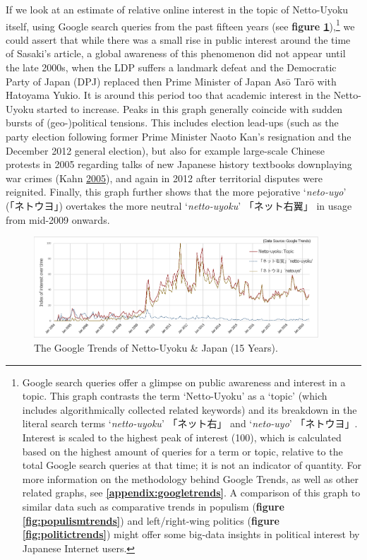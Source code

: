 \documentclass[10pt,british,A4paper,,openany]{memoir}
\begin{document}
If we look at an estimate of relative online interest in the topic of
Netto-Uyoku itself, using Google search queries from the past fifteen
years (see \textbf{figure \ref{fig:nettouyoku}}),\footnote{Google search
  queries offer a glimpse on public awareness and interest in a topic.
  This graph contrasts the term `Netto-Uyoku' as a `topic' (which
  includes algorithmically collected related keywords) and its breakdown
  in the literal search terms `\emph{netto-uyoku}' 「ネット右」 and
  `\emph{neto-uyo}' 「ネトウヨ」. Interest is scaled to the highest peak
  of interest (100), which is calculated based on the highest amount of
  queries for a term or topic, relative to the total Google search
  queries at that time; it is not an indicator of quantity. For more
  information on the methodology behind Google Trends, as well as other
  related graphs, see \textbf{\ref{appendix:googletrends}}. A comparison
  of this graph to similar data such as comparative trends in populism
  (\textbf{figure \ref{fig:populismtrends}}) and left/right-wing
  politics (\textbf{figure \ref{fig:politictrends}}) might offer some
  big-data insights in political interest by Japanese Internet users.}
we could assert that while there was a small rise in public interest
around the time of Sasaki's article, a global awareness of this
phenomenon did not appear until the late 2000s, when the LDP suffers a
landmark defeat and the Democratic Party of Japan (DPJ) replaced then
Prime Minister of Japan Asō Tarō with Hatoyama Yukio. It is around this
period too that academic interest in the Netto-Uyoku started to
increase. Peaks in this graph generally coincide with sudden bursts of
(geo-)political tensions. This includes election lead-ups (such as the
party election following former Prime Minister Naoto Kan's resignation
and the December 2012 general election), but also for example
large-scale Chinese protests in 2005 regarding talks of new Japanese
history textbooks downplaying war crimes (Kahn
\protect\hyperlink{ref-kahn_riot_2005}{2005}), and again in 2012 after
territorial disputes were reignited. Finally, this graph further shows
that the more pejorative `\emph{neto-uyo}' (「ネトウヨ」) overtakes the
more neutral `\emph{netto-uyoku}' 「ネット右翼」 in usage from mid-2009
onwards.

\begin{figure}[!htb]
 \centering
  \caption{\label{fig:nettouyoku} The Google Trends of Netto-Uyoku \& Japan (15 Years).}
 \includegraphics[width=0.95\textwidth,trim=4 4 4 4,clip]{images/nettouyoku2.eps}
\end{figure}
\end{document}
